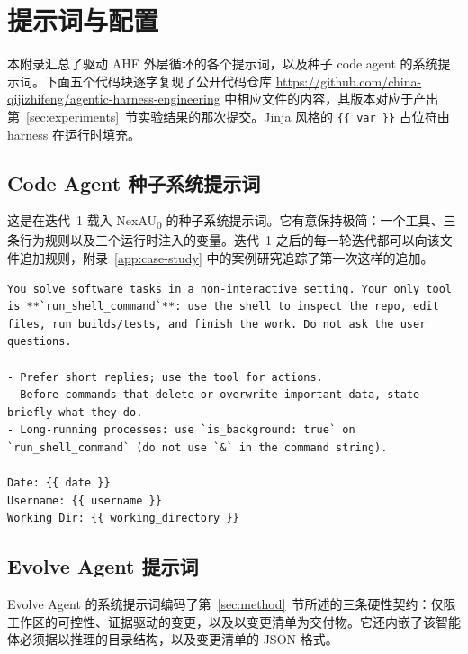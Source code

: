 \section{提示词与配置}
\label{app:prompts}

本附录汇总了驱动 AHE 外层循环的各个提示词，以及种子 code agent 的系统提示词。下面五个代码块逐字复现了公开代码仓库 \url{https://github.com/china-qijizhifeng/agentic-harness-engineering} 中相应文件的内容，其版本对应于产出第~\ref{sec:experiments}~节实验结果的那次提交。Jinja 风格的 \texttt{\{\{ var \}\}} 占位符由 harness 在运行时填充。

\subsection{Code Agent 种子系统提示词}
\label{app:prompts:code-seed}

这是在迭代~1 载入 NexAU\textsubscript{0} 的种子系统提示词。它有意保持极简：一个工具、三条行为规则以及三个运行时注入的变量。迭代~1 之后的每一轮迭代都可以向该文件追加规则，附录~\ref{app:case-study} 中的案例研究追踪了第一次这样的追加。

\begin{tcolorbox}[breakable, colback=aheSky!10, colframe=aheNavy, colbacktitle=aheNavy, coltitle=white,
    title={\scriptsize\textbf{\texttt{code\_agent\_simple/systemprompt.md}}},
    boxrule=0.6pt, left=4pt, right=4pt, top=3pt, bottom=3pt]
\begin{lstlisting}
You solve software tasks in a non-interactive setting. Your only tool is **`run_shell_command`**: use the shell to inspect the repo, edit files, run builds/tests, and finish the work. Do not ask the user questions.

- Prefer short replies; use the tool for actions.
- Before commands that delete or overwrite important data, state briefly what they do.
- Long-running processes: use `is_background: true` on `run_shell_command` (do not use `&` in the command string).

Date: {{ date }}
Username: {{ username }}
Working Dir: {{ working_directory }}
\end{lstlisting}
\end{tcolorbox}

\subsection{Evolve Agent 提示词}
\label{app:prompts:evolve}

Evolve Agent 的系统提示词编码了第~\ref{sec:method}~节所述的三条硬性契约：仅限工作区的可控性、证据驱动的变更，以及以变更清单为交付物。它还内嵌了该智能体必须据以推理的目录结构，以及变更清单的 JSON 格式。

